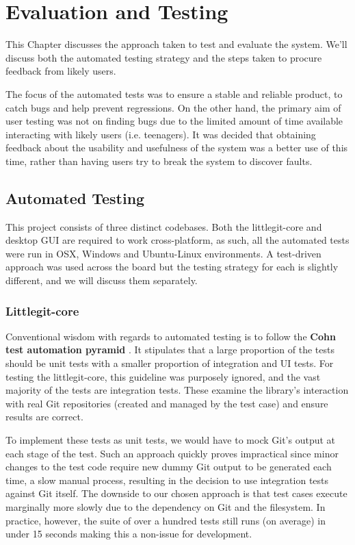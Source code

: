 \chapter{Evaluation and Testing}

This Chapter discusses the approach taken to test and evaluate the system. We'll discuss both the automated testing strategy and the steps taken to procure feedback from likely users. 

The focus of the automated tests was to ensure a stable and reliable product, to catch bugs and help prevent regressions. On the other hand, the primary aim of user testing was not on finding bugs due to the limited amount of time available interacting with likely users (i.e. teenagers). It was decided that obtaining feedback about the usability and usefulness of the system was a better use of this time, rather than having users try to break the system to discover faults.

\section{Automated Testing}

This project consists of three distinct codebases. Both the littlegit-core and desktop GUI are required to work cross-platform, as such, all the automated tests were run in OSX, Windows and Ubuntu-Linux environments. A test-driven approach was used across the board but the testing strategy for each is slightly different, and we will discuss them separately. 

\subsection{Littlegit-core}

Conventional wisdom with regards to automated testing is to follow the \textbf{Cohn test automation pyramid} \cite{testpyramid}. It stipulates that a large proportion of the tests should be unit tests with a smaller proportion of integration and UI tests. For testing the littlegit-core, this guideline was purposely ignored, and the vast majority of the tests are integration tests. These examine the library's interaction with real Git repositories (created and managed by the test case) and ensure results are correct. 

To implement these tests as unit tests, we would have to mock Git's output at each stage of the test. Such an approach quickly proves impractical since minor changes to the test code require new dummy Git output to be generated each time, a slow manual process, resulting in the decision to use integration tests against Git itself. The downside to our chosen approach is that test cases execute marginally more slowly due to the dependency on Git and the filesystem. In practice, however, the suite of over a hundred tests still runs (on average) in under 15 seconds making this a non-issue for development.

